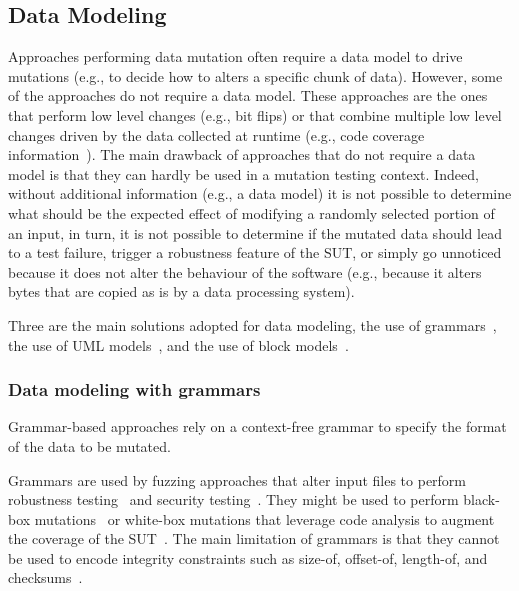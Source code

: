 
\subsection{Data Modeling}
\label{sec:dataModeling}

Approaches performing data mutation often require a data model to drive mutations (e.g., to decide how to alters a specific chunk of data). 
However, some of the approaches do not require a data model. 
These approaches are the ones that perform low level changes (e.g., bit flips) or that combine multiple low level changes driven by the data collected at runtime (e.g., code coverage information~\cite{}).
The main drawback of approaches that do not require a data model is that they can hardly be used in a mutation testing context.
Indeed, without additional information (e.g., a data model) it is not possible to determine what should be the expected effect of modifying a randomly selected portion of an input, in turn, it is not possible to determine if the mutated data should lead to a test failure, trigger a robustness feature of the SUT, or simply go unnoticed because it does not alter the behaviour of the software (e.g., because it alters bytes that are copied as is by a data processing system).

Three are the main solutions adopted for data modeling, the use of grammars~\cite{ghosh1998testing,Godefroid:GrammarBasedFuzzying:2008,godefroid2012sage,bounimova2013billions}, the use of UML models~\cite{di2015evolutionary}, and the use of block models~\cite{pham2016model,PeachFuzzer}.

\subsubsection{Data modeling with grammars}

Grammar-based approaches rely on a context-free grammar to specify the format of the data to be mutated. 

Grammars are used by fuzzing approaches that alter input files to perform robustness testing~\cite{ghosh1998testing} and security testing~\cite{Appelt:SQLI:ISSTA:2014,Jan:ISSTA:2016}. They might be used to perform black-box mutations~\cite{ghosh1998testing} or white-box mutations that leverage code analysis to augment the coverage of the SUT~\cite{Godefroid:GrammarBasedFuzzying:2008}.
The main limitation of grammars is that they cannot be used to encode integrity constraints such as size-of, offset-of, length-of, and checksums~\cite{pham2016model}. 

